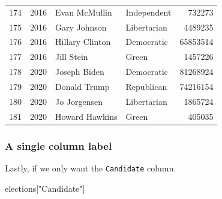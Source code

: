 \documentclass[
  letterpaper,
  DIV=11,
  numbers=noendperiod]{scrreprt}
\newenvironment{Shaded}{\begin{snugshade}}{\end{snugshade}}
\newcommand{\NormalTok}[1]{\textcolor[rgb]{0.00,0.23,0.31}{#1}}
\newcommand{\StringTok}[1]{\textcolor[rgb]{0.13,0.47,0.30}{#1}}
\begin{document}
\begin{tabular}{lrllr}
174 &  2016 &           Evan McMullin &            Independent &        732273 \\
175 &  2016 &            Gary Johnson &            Libertarian &       4489235 \\
176 &  2016 &         Hillary Clinton &             Democratic &      65853514 \\
177 &  2016 &              Jill Stein &                  Green &       1457226 \\
178 &  2020 &            Joseph Biden &             Democratic &      81268924 \\
179 &  2020 &            Donald Trump &             Republican &      74216154 \\
180 &  2020 &            Jo Jorgensen &            Libertarian &       1865724 \\
181 &  2020 &          Howard Hawkins &                  Green &        405035 \\
\bottomrule
\end{tabular}

\hypertarget{a-single-column-label}{%
\subsubsection{A single column label}\label{a-single-column-label}}

Lastly, if we only want the \texttt{Candidate} column.

\begin{Shaded}
\begin{Highlighting}[]
\NormalTok{elections[}\StringTok{"Candidate"}\NormalTok{]}
\end{Highlighting}
\end{Shaded}
\end{document}
